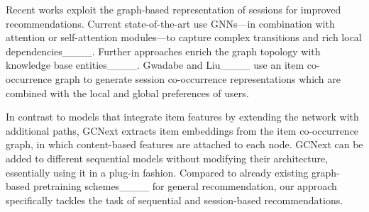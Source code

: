 Recent works exploit the graph-based representation of sessions for improved recommendations. Current state-of-the-art use GNNs---in combination with attention or self-attention modules---to capture complex transitions and rich local dependencies____. Further approaches enrich the graph topology with knowledge base entities____. Gwadabe and Liu____ use an item co-occurrence graph to generate session co-occurrence representations which are combined with the local and global preferences of users.

In contrast to models that integrate item features by extending the network with additional paths, GCNext extracts item embeddings from the item co-occurrence graph, in which content-based features are attached to each node. GCNext can be added to different sequential models without modifying their architecture, essentially using it in a plug-in fashion. Compared to already existing graph-based pretraining schemes____ for general recommendation, our approach specifically tackles the task of sequential and session-based recommendations.